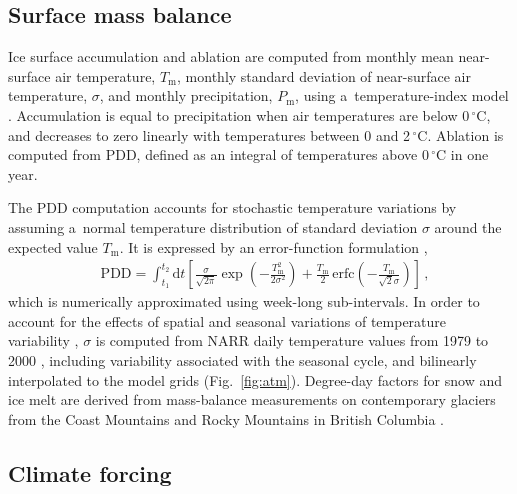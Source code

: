 \documentclass{article}
\newcommand{\unit}[1]{\ensuremath{\mathrm{#1}}}
\newcommand{\degree}[0]{\ensuremath{^{\circ}}}
\begin{document}
\subsection{Surface mass balance}
\label{sec:surface}

      Ice surface accumulation and ablation are computed from monthly mean
      near-surface air temperature, $T_{\mathrm{m}}$, monthly standard
      deviation of near-surface air temperature, $\sigma$, and monthly
      precipitation, $P_{\mathrm{m}}$, using a~temperature-index model
      \citep[e.g.,][]{Hock.2003}. Accumulation is equal to precipitation
      when air temperatures are below 0\,\unit{{\degree}C}, and decreases to
      zero linearly with temperatures between 0 and 2\,\unit{{\degree}C}.
      Ablation is computed from PDD, defined as an integral of temperatures
      above 0\,\unit{{\degree}C} in one year.

      The PDD computation accounts for stochastic temperature variations by
      assuming a~normal temperature distribution of standard deviation
      $\sigma$ around the expected value $T_{\mathrm{m}}$. It is expressed
      by an error-function formulation \citep{Calov.Greve.2005},
\begin{align}
&\label{eqn:calovgreve}
    {\text{PDD}} = \int_{t_1}^{t_2} \mathrm{d}t
        \left[\frac{\sigma}{\sqrt{2\pi}}
                \exp\left({-\frac{T_{\mathrm{m}}^2}{2\sigma^2}}\right)
              + \frac{T_{\mathrm{m}}}{2} \, {\text{erfc}}
                \left(-\frac{T_{\mathrm{m}}}{\sqrt{2}\sigma}\right)\right] \,,
\end{align}
      which is numerically approximated using week-long sub-intervals. In
      order to account for the effects of spatial and seasonal variations of
      temperature variability \citep{Seguinot.2013}, $\sigma$ is computed
      from NARR daily temperature values from 1979 to 2000
      \citep{Mesinger.etal.2006}, including variability associated with the
      seasonal cycle, and bilinearly interpolated to the model grids
      (Fig.~\ref{fig:atm}). Degree-day factors for snow and
      ice melt are derived from mass-balance measurements on contemporary
      glaciers from the Coast Mountains and Rocky Mountains in British
      Columbia \citep[Table~\ref{tab:params};][]{Shea.etal.2009}.

\subsection{Climate forcing}
\label{sec:atm}%
\end{document}
